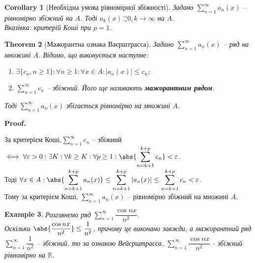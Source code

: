 \documentclass[a4paper, 10pt]{article}
\makeatletter
\def\huge{\displaystyle}
\def\qed{$\blacksquare$}
\theoremstyle{theoremdd}
\newtheorem{theorem}{Theorem}[subsection]
\theoremstyle{theoremdd}
\theoremstyle{theoremdd}
\theoremstyle{theoremdd}
\theoremstyle{theoremdd}
\newtheorem{example}[theorem]{Example}
\theoremstyle{theoremdd}
\theoremstyle{theoremdd}
\theoremstyle{theoremdd}
\theoremstyle{theoremdd}
\newtheorem{corollary}[theorem]{Corollary}
\renewenvironment{proof}[1][Proof.\\]{\par
\pushQED{\hfill \qed}%
\normalfont \topsep6\p@\@plus6\p@\relax
\trivlist
\item\relax
{\bfseries
#1\@addpunct{.}}\hspace\labelsep\ignorespaces
}{%
\popQED\endtrivlist\@endpefalse
}
\newcommand{\tounif}{^\rightarrow_\rightarrow}
\makeatother
\begin{document}
\begin{corollary}[Необхідна умова рівномірної збіжності]
Задано $\huge\sum_{n=1}^\infty a_n(x)$ -- рівномірно збіжний на $A$. Тоді $a_k(x){}\tounif 0, k \to \infty$ на $A$.\\
\textit{Вказівка: критерій Коші при $p = 1$.}
\end{corollary}

\begin{theorem}[Мажорантна ознака Ваєрштрасса]
Задано $\huge \sum_{n=1}^\infty a_n(x)$ -- ряд на множині $A$. Відомо, що виконується наступне:
\begin{enumerate}[nosep,wide=0pt,label={\arabic*)}]
\item $\exists \{c_n, n \geq 1\}: \forall n \geq 1: \forall x \in A: |a_n(x)| \leq c_n$;\\
\item $\huge \sum_{n=1}^\infty c_n$ -- збіжний. Його ще називають \textbf{мажорантним рядом}.
\end{enumerate}
Тоді $\huge \sum_{n=1}^\infty a_n(x)$ збігається рівномірно на множині $A$.
\end{theorem}

\begin{proof}
За критерієм Коші,$\huge \sum_{n=1}^\infty c_n$ -- збіжний $\iff \forall \varepsilon > 0: \exists K: \forall k \geq K: \forall p \geq 1: \huge \abs{\sum_{n=k+1}^{k+p} c_n} < \varepsilon$. \\
Тоді $\forall x \in A: \huge\abs{\sum_{n=k+1}^{k+p} a_n(x)} \leq \sum_{n=k+1}^{k+p} |a_n(x)| \leq \sum_{n=k+1}^{k+p} c_n < \varepsilon$.\\
Тому за критерієм Коші, $\huge \sum_{n=1}^\infty a_n(x)$ -- рівномірно збіжний на множині $A$.
\end{proof}

\begin{example}
Розглянемо ряд $\huge\sum_{n=1}^\infty \dfrac{\cos nx}{n^2}$.\\
Оскільки $\abs{\dfrac{\cos nx}{n^2}} \leq \dfrac{1}{n^2}$, причому це виконано завжди, а мажорантний ряд $\huge\sum_{n=1}^\infty \dfrac{1}{n^2}$ -- збіжний, то за ознакою Вейєрштрасса, $\huge\sum_{n=1}^\infty \dfrac{\cos nx}{n^2}$ - збіжний рівномірно на $\mathbb{R}$.
\end{example}
\end{document}
